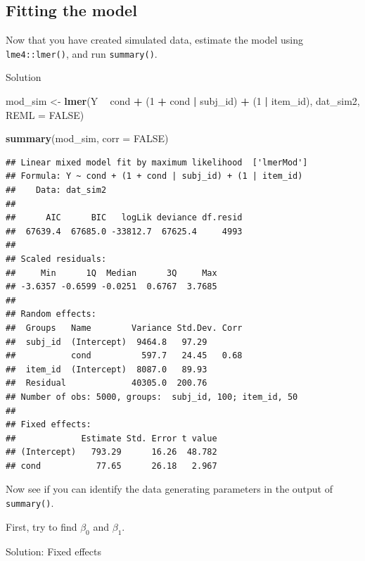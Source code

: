 \documentclass[]{book}
\newenvironment{Shaded}{\begin{snugshade}}{\end{snugshade}}
\newcommand{\DataTypeTok}[1]{\textcolor[rgb]{0.13,0.29,0.53}{#1}}
\newcommand{\DecValTok}[1]{\textcolor[rgb]{0.00,0.00,0.81}{#1}}
\newcommand{\KeywordTok}[1]{\textcolor[rgb]{0.13,0.29,0.53}{\textbf{#1}}}
\newcommand{\NormalTok}[1]{#1}
\newcommand{\OperatorTok}[1]{\textcolor[rgb]{0.81,0.36,0.00}{\textbf{#1}}}
\newcommand{\OtherTok}[1]{\textcolor[rgb]{0.56,0.35,0.01}{#1}}
\newcommand{\StringTok}[1]{\textcolor[rgb]{0.31,0.60,0.02}{#1}}
\begin{document}
\hypertarget{fitting-the-model}{%
\subsection{Fitting the model}\label{fitting-the-model}}

Now that you have created simulated data, estimate the model using \texttt{lme4::lmer()}, and run \texttt{summary()}.

Solution

\begin{Shaded}
\begin{Highlighting}[]
\NormalTok{mod_sim <-}\StringTok{ }\KeywordTok{lmer}\NormalTok{(Y }\OperatorTok{~}\StringTok{ }\NormalTok{cond }\OperatorTok{+}\StringTok{ }\NormalTok{(}\DecValTok{1} \OperatorTok{+}\StringTok{ }\NormalTok{cond }\OperatorTok{|}\StringTok{ }\NormalTok{subj_id) }\OperatorTok{+}\StringTok{ }\NormalTok{(}\DecValTok{1} \OperatorTok{|}\StringTok{ }\NormalTok{item_id),}
\NormalTok{                dat_sim2, }\DataTypeTok{REML =} \OtherTok{FALSE}\NormalTok{)}

\KeywordTok{summary}\NormalTok{(mod_sim, }\DataTypeTok{corr =} \OtherTok{FALSE}\NormalTok{)}
\end{Highlighting}
\end{Shaded}

\begin{verbatim}
## Linear mixed model fit by maximum likelihood  ['lmerMod']
## Formula: Y ~ cond + (1 + cond | subj_id) + (1 | item_id)
##    Data: dat_sim2
## 
##      AIC      BIC   logLik deviance df.resid 
##  67639.4  67685.0 -33812.7  67625.4     4993 
## 
## Scaled residuals: 
##     Min      1Q  Median      3Q     Max 
## -3.6357 -0.6599 -0.0251  0.6767  3.7685 
## 
## Random effects:
##  Groups   Name        Variance Std.Dev. Corr
##  subj_id  (Intercept)  9464.8   97.29       
##           cond          597.7   24.45   0.68
##  item_id  (Intercept)  8087.0   89.93       
##  Residual             40305.0  200.76       
## Number of obs: 5000, groups:  subj_id, 100; item_id, 50
## 
## Fixed effects:
##             Estimate Std. Error t value
## (Intercept)   793.29      16.26  48.782
## cond           77.65      26.18   2.967
\end{verbatim}

Now see if you can identify the data generating parameters in the output of \texttt{summary()}.

First, try to find \(\beta_0\) and \(\beta_1\).

Solution: Fixed effects
\end{document}
